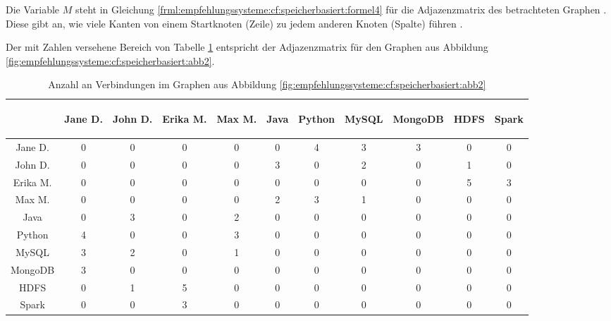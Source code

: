 Die Variable $M$ steht in Gleichung \ref{frml:empfehlungssysteme:cf:speicherbasiert:formel4} für die Adjazenzmatrix des betrachteten Graphen \cite[S. 4]{libenNowell:2007}. Diese gibt an, wie viele Kanten von einem Startknoten (Zeile) zu jedem anderen Knoten (Spalte) führen \cite[S. 6]{guns:2014}.

Der mit Zahlen versehene Bereich von Tabelle \ref{tbl:empfehlungssysteme:arbeitsweise:tbl2} entspricht der Adjazenzmatrix für den Graphen aus Abbildung \ref{fig:empfehlungssysteme:cf:speicherbasiert:abb2}.

\begin{table}[h]
	\centering
	\begin{tabular}{c|c|c|c|c|c|c|c|c|c|c}
		& \begin{sideways}Jane D.\end{sideways} & \begin{sideways}John D.\end{sideways} & \begin{sideways}Erika M.\end{sideways} & \begin{sideways}Max M.\end{sideways} & \begin{sideways}Java\end{sideways} & \begin{sideways}Python\end{sideways} & \begin{sideways}MySQL\end{sideways} & \begin{sideways}MongoDB\end{sideways} & \begin{sideways}HDFS\end{sideways} & \begin{sideways}Spark\end{sideways} \\
		\hline
		Jane D.  & 0 & 0 & 0 & 0 & 0 & 4 & 3 & 3 & 0 & 0\\
		John D.  & 0 & 0 & 0 & 0 & 3 & 0 & 2 & 0 & 1 & 0\\
		Erika M. & 0 & 0 & 0 & 0 & 0 & 0 & 0 & 0 & 5 & 3\\
		Max M.   & 0 & 0 & 0 & 0 & 2 & 3 & 1 & 0 & 0 & 0\\
		Java     & 0 & 3 & 0 & 2 & 0 & 0 & 0 & 0 & 0 & 0\\
		Python   & 4 & 0 & 0 & 3 & 0 & 0 & 0 & 0 & 0 & 0\\
		MySQL    & 3 & 2 & 0 & 1 & 0 & 0 & 0 & 0 & 0 & 0\\
		MongoDB  & 3 & 0 & 0 & 0 & 0 & 0 & 0 & 0 & 0 & 0\\
		HDFS     & 0 & 1 & 5 & 0 & 0 & 0 & 0 & 0 & 0 & 0\\
		Spark    & 0 & 0 & 3 & 0 & 0 & 0 & 0 & 0 & 0 & 0
	\end{tabular}
	\caption{Anzahl an Verbindungen im Graphen aus Abbildung \ref{fig:empfehlungssysteme:cf:speicherbasiert:abb2}}
	\label{tbl:empfehlungssysteme:arbeitsweise:tbl2}
\end{table}

